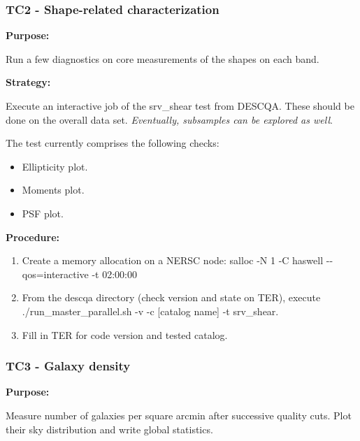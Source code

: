 \documentclass[11pt, a4paper]{article}
\begin{document}
\subsubsection{TC2 - Shape-related characterization}
\textbf{Purpose:} 

Run a few diagnostics on core measurements of the shapes on each band. 

\textbf{Strategy:} 

Execute an interactive job of the srv\_shear test from DESCQA. These should be done on the overall data set.  \textit{Eventually, subsamples can be explored as well}.

The test currently comprises the following checks:
\begin{itemize}
	\item Ellipticity plot. 
	\item Moments plot.
	\item PSF plot.
\end{itemize}

\textbf{Procedure:} 

\begin{enumerate}
	\item Create a memory allocation on a NERSC node: salloc -N 1 -C haswell -{}-qos=interactive -t 02:00:00
	\item From the descqa directory (check version and state on TER), execute ./run\_master\_parallel.sh -v -c [catalog name] -t srv\_shear. 
	\item Fill in TER for code version and tested catalog.
\end{enumerate}

\subsubsection{TC3 - Galaxy density}
\textbf{Purpose:} 

Measure number of galaxies per square arcmin after successive quality cuts. Plot their sky distribution and write global statistics.
\end{document}
